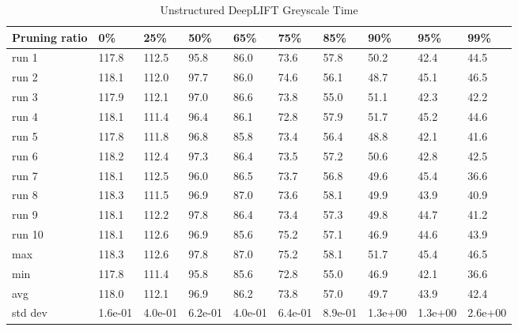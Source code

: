 \documentclass[journal,onecolumn,12pt]{IEEEtran}
\begin{document}
\begin{table}[htbp]
    \caption{Unstructured DeepLIFT Greyscale Time}
    \begin{center}
    \begin{tabular}{ |p{2cm}|p{1cm}|p{1cm}|p{1cm}|p{1cm}|p{1cm}|p{1cm}|p{1cm}|p{1cm}|p{1cm}|  }
     \hline
     Pruning ratio  & 0\% & 25\%& 50\%& 65\%& 75\%& 85\%& 90\%& 95\%& 99\%\\
     \hline
     run 1&117.8&112.5&95.8&86.0&73.6&57.8&50.2&42.4&44.5\\
     run 2&118.1&112.0&97.7&86.0&74.6&56.1&48.7&45.1&46.5\\
     run 3&117.9&112.1&97.0&86.6&73.8&55.0&51.1&42.3&42.2\\
     run 4&118.1&111.4&96.4&86.1&72.8&57.9&51.7&45.2&44.6\\
     run 5&117.8&111.8&96.8&85.8&73.4&56.4&48.8&42.1&41.6\\
     run 6&118.2&112.4&97.3&86.4&73.5&57.2&50.6&42.8&42.5\\
     run 7&118.1&112.5&96.0&86.5&73.7&56.8&49.6&45.4&36.6\\
     run 8&118.3&111.5&96.9&87.0&73.6&58.1&49.9&43.9&40.9\\
     run 9&118.1&112.2&97.8&86.4&73.4&57.3&49.8&44.7&41.2\\
     run 10&118.1&112.6&96.9&85.6&75.2&57.1&46.9&44.6&43.9\\
     \hline
        max     &118.3&112.6&97.8&87.0&75.2&58.1&51.7&45.4&46.5\\
        min     &117.8&111.4&95.8&85.6&72.8&55.0&46.9&42.1&36.6\\
        avg     &118.0&112.1&96.9&86.2&73.8&57.0&49.7&43.9&42.4\\
        std dev &1.6e-01&4.0e-01&6.2e-01&4.0e-01&6.4e-01&8.9e-01&1.3e+00&1.3e+00&2.6e+00\\
     \hline
    \end{tabular}
    \end{center}
    \label{tab:a10}
\end{table}



\end{document}
